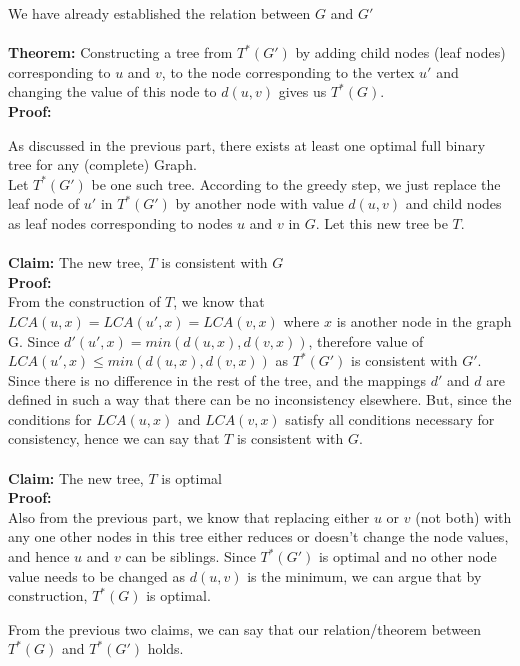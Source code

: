 \documentclass{article}
\begin{document}
        We have already established the relation between $G$ and $G'$
        \\
        \\
        \textbf{Theorem:} Constructing a tree from $T^{*}(G')$ by adding child nodes (leaf nodes) corresponding to $u$ and $v$, to the node corresponding to the vertex $u'$ and changing the value of this node to $d(u, v)$ gives us $T^{*}(G)$.
        \\
        \textbf{Proof:}
        \\
        \begin{addmargin}{1.5em}
            As discussed in the previous part, there exists at least one optimal full binary tree for any (complete) Graph.
            \\
            Let $T^{*}(G')$ be one such tree. According to the greedy step, we just replace the leaf node of $u'$ in $T^{*}(G')$ by another node with value $d(u, v)$ and child nodes as leaf nodes corresponding to nodes $u$ and $v$ in $G$. Let this new tree be $T$.
            \\
            \\
            \textbf{Claim:} The new tree, $T$ is consistent with $G$
            \\
            \textbf{Proof:}
            \\
            From the construction of $T$, we know that $LCA(u, x) = LCA(u', x) = LCA(v, x)$ where $x$ is another node in the graph G. Since $d'(u', x) = min(d(u, x), d(v, x))$, therefore value of $LCA(u', x) \le min(d(u, x), d(v, x))$ as $T^*(G')$ is consistent with $G'$. Since there is no difference in the rest of the tree, and the mappings $d'$ and $d$ are defined in such a way that there can be no inconsistency elsewhere. But, since the conditions for $LCA(u, x)$ and $LCA(v, x)$ satisfy all conditions necessary for consistency, hence we can say that $T$ is consistent with $G$.
            \\
            \\
            \textbf{Claim:} The new tree, $T$ is optimal
            \\
            \textbf{Proof:}
            \\
            Also from the previous part, we know that replacing either $u$ or $v$ (not both) with any one other nodes in this tree either reduces or doesn't change the node values, and hence $u$ and $v$ can be siblings. Since $T^*(G')$ is optimal and no other node value needs to be changed as $d(u, v)$ is the minimum, we can argue that by construction, $T^*(G)$ is optimal.
            \\
        \end{addmargin}
        From the previous two claims, we can say that our relation/theorem between $T^*(G)$ and $T^*(G')$ holds.
        
\end{document}
